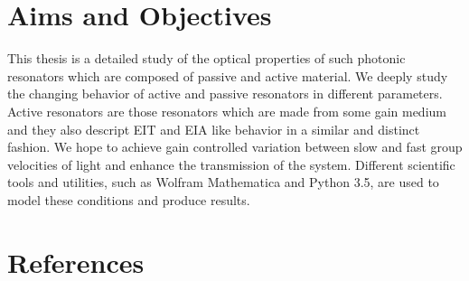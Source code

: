 \section{Aims and Objectives}
This thesis is a detailed study of the optical properties of such photonic resonators which are composed of passive and active material. We deeply study the changing behavior of active and passive resonators in different parameters. Active resonators are those resonators which are made from some gain medium and they also descript EIT and EIA like behavior in a similar and distinct fashion. We hope to achieve gain controlled variation between slow and fast group velocities of light and enhance the transmission of the system. Different scientific tools and utilities, such as Wolfram Mathematica and Python 3.5, are used to model these conditions and produce results.


\newpage
\section*{References}

